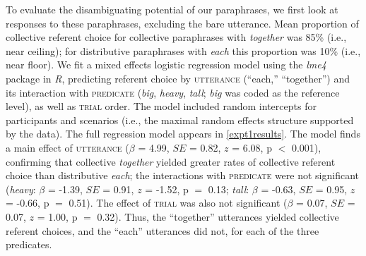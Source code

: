 \documentclass[preprint,12pt,authoryear,titlepage]{elsarticle}
\newcommand{\ndg}[1]{\textcolor{Green}{[ndg: #1]}}
\newcommand{\gcs}[1]{\textcolor{blue}{[gcs: #1]}}
\begin{document}
To evaluate the disambiguating potential of our paraphrases, we first look at responses to these paraphrases, excluding the bare utterance. Mean proportion of collective referent choice for collective paraphrases with \emph{together} was 85\% (i.e., near ceiling); for distributive paraphrases with \emph{each} this proportion was 10\% (i.e., near floor). We fit a mixed effects logistic regression model \citep{baayenetal2008} using the \emph{lme4} package \citep{batesetal2014} in \emph{R}, predicting referent choice by \textsc{utterance} (``each,'' ``together'') and its interaction with \textsc{predicate} (\emph{big}, \emph{heavy}, \emph{tall}; \emph{big} was coded as the reference level), as well as \textsc{trial} order.  The model included random intercepts for participants and scenarios (i.e., the maximal random effects structure supported by the data). The full regression model appears in \ref{expt1results}. The model finds a main effect of \textsc{utterance} ($\beta$ = 4.99, $SE$ = 0.82, $z$ = 6.08, p $<$ 0.001), confirming that collective \emph{together} yielded greater rates of collective referent choice than distributive \emph{each}; the interactions with \textsc{predicate} were not significant (\emph{heavy}: $\beta$ = -1.39, $SE$ = 0.91, $z$ = -1.52, p $=$ 0.13; \emph{tall}: $\beta$ = -0.63, $SE$ = 0.95, $z$ = -0.66, p $=$ 0.51). The effect of \textsc{trial} was also not significant ($\beta$ = 0.07, $SE$ = 0.07, $z$ = 1.00, p $=$ 0.32). Thus, the ``together'' utterances yielded collective referent choices, and the ``each'' utterances did not, for each of the three predicates.
\end{document}
